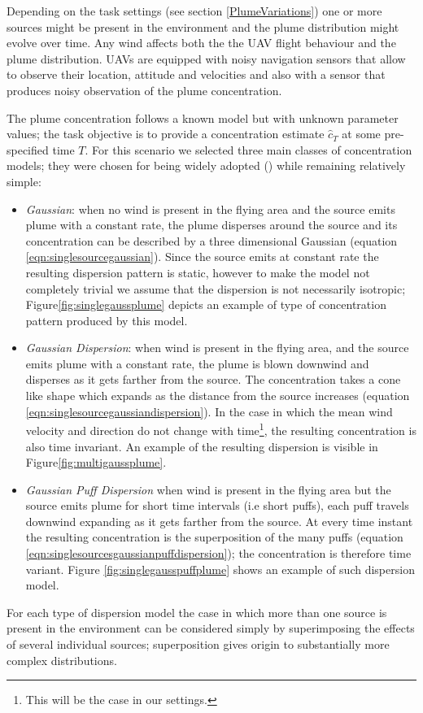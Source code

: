 \documentclass[a4paper,11pt]{report}
\begin{document}
Depending on the task settings (see section \ref{PlumeVariations}) one or more sources might be present in the environment and the plume distribution might evolve over time. Any wind affects both the the UAV flight behaviour and the plume distribution.
UAVs are equipped with noisy navigation sensors that allow to observe their location, attitude and velocities and also with a sensor that produces noisy observation of the plume concentration. 

The plume concentration follows a known model but with unknown parameter values; the task objective is to provide a concentration estimate $\hat{c}_T$ at some pre-specified time $T$. 
For this scenario we selected three main classes of concentration models; they were chosen for being widely adopted (\cite{stockie2011}) while remaining relatively simple:
\begin{itemize}
\item \textit{Gaussian}: when no wind is present in the flying area and the source emits plume with a constant rate, the plume disperses around the source and its concentration can be described by a three dimensional Gaussian (equation \ref{eqn:singlesourcegaussian}). Since the source emits at constant rate the resulting dispersion pattern is static, however to make the model not completely trivial we assume that the dispersion is not necessarily isotropic; Figure\ref{fig:singlegaussplume} depicts an example of type of concentration pattern produced by this model.
\item \textit{Gaussian Dispersion}: when wind is present in the flying area, and the source emits plume with a constant rate, the plume is blown downwind and disperses as it gets farther from the source. The concentration takes a cone like shape which expands as the distance from the source increases (equation \ref{eqn:singlesourcegaussiandispersion}). In the case in which the mean wind velocity and direction do not change with time\footnote{This will be the case in our settings.}, the resulting concentration is also time invariant. An example of the resulting dispersion is visible in Figure\ref{fig:multigaussplume}.
\item \textit{Gaussian Puff Dispersion} when wind is present in the flying area but the source emits plume for short time intervals (i.e short puffs), each puff travels downwind expanding as it gets farther from the source. At every time instant the resulting concentration is the superposition of the many puffs (equation \ref{eqn:singlesourcesgaussianpuffdispersion}); the concentration is therefore time variant.  Figure \ref{fig:singlegausspuffplume} shows an example of such dispersion model.
\end{itemize}
For each type of dispersion model the case in which more than one source is present in the environment can be considered simply by superimposing the effects of several individual sources; superposition gives origin to substantially more complex distributions.
\end{document}

